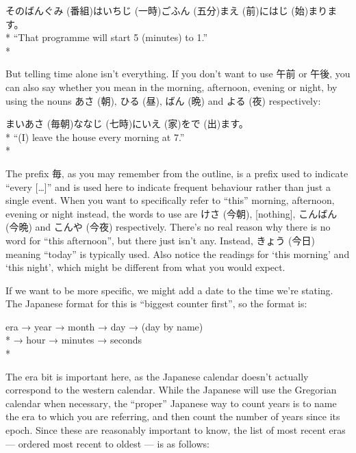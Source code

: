 \documentclass[11pt, b5paper, twoside, openright, onecolumn]{book}
\makeatletter
\newcommand*{\rubystack}[2]{{\relscale{0.5}%
  \begin{tabular}[b]{@{}c@{}}%
    {#1}\\%
   {\textscale{2}{#2}}%
  \end{tabular}}%
}
\DeclareRobustCommand*{\ruby}[2]{%
  \mbox{%
    \setlength{\parskip}{0ex}%
    \BeginAccSupp{method=pdfstringdef,ActualText={#1}}%
      \rubystack{\phantom{#2}}{#1}%
      \llap{%
        \rubystack{#2}{\phantom{#1}}%
      }%
    \EndAccSupp{}%
  }%
}
\renewcommand*{\ruby}[2]{#2 (#1)}%
\newenvironment{exampleblock}{
\setlength{\parindent}{0.6in}
\begin{minipage}[t]{\dimexpr\textwidth-\parindent}}
{\end{minipage}}
\makeatother
\begin{document}
\begin{exampleblock}
その\ruby{番組}{ばんぐみ}は\ruby{一時}{いちじ}\ruby{五分}{ごふん}\ruby{前}{まえ}に\ruby{始}{はじ}まります。 \\* 
“That programme will start 5 (minutes) to 1.” \\* 
\end{exampleblock}
\vspace{0.2cm}

But telling time alone isn’t everything. If you don’t want to use 午前 or 午後‚ you can also say whether you mean in the morning‚ afternoon‚ evening or night‚ by using the nouns \ruby{朝}{あさ}‚ \ruby{昼}{ひる}‚ \ruby{晩}{ばん} and \ruby{夜}{よる} respectively:

\vspace{0.4cm}
\begin{exampleblock}
\ruby{毎朝}{まいあさ}\ruby{七時}{ななじ}に\ruby{家}{いえ}を\ruby{出}{で}ます。 \\* 
“(I) leave the house every morning at 7.” \\* 
\end{exampleblock}
\vspace{0.2cm}

The prefix 毎‚ as you may remember from the outline‚ is a prefix used to indicate “every […]” and is used here to indicate frequent behaviour rather than just a single event. When you want to specifically refer to “this” morning‚ afternoon‚ evening or night instead‚ the words to use are \ruby{今朝}{けさ}‚ [nothing]‚ \ruby{今晩}{こんばん} and \ruby{今夜}{こんや} respectively. There’s no real reason why there is no word for “this afternoon”‚ but there just isn’t any. Instead‚ \ruby{今日}{きょう} meaning “today” is typically used. Also notice the readings for ‘this morning’ and ‘this night’‚ which might be different from what you would expect. 

If we want to be more specific‚ we might add a date to the time we’re stating. The Japanese format for this is “biggest counter first”‚ so the format is:

\vspace{0.4cm}
\begin{exampleblock}
era → year → month → day → (day by name) \\* → hour → minutes → seconds \\* 
\end{exampleblock}
\vspace{0.2cm}
The era bit is important here‚ as the Japanese calendar doesn’t actually correspond to the western calendar. While the Japanese will use the Gregorian calendar when necessary‚ the “proper” Japanese way to count years is to name the era to which you are referring‚ and then count the number of years since its epoch. Since these are reasonably important to know‚ the list of most recent eras — ordered most recent to oldest — is as follows:
\end{document}
